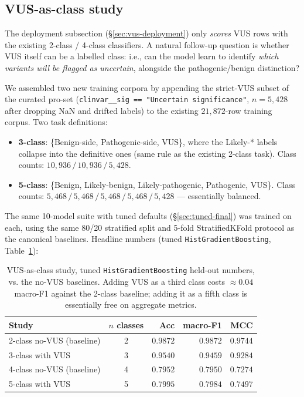 \documentclass[11pt,a4paper]{article}
\begin{document}
\subsection{VUS-as-class study}
\label{sec:vus-class}

The deployment subsection (\S\ref{sec:vus-deployment}) only \emph{scores}
VUS rows with the existing 2-class / 4-class classifiers. A natural
follow-up question is whether VUS itself can be a labelled class:
i.e., can the model learn to identify \emph{which variants will be
flagged as uncertain}, alongside the pathogenic/benign distinction?

We assembled two new training corpora by appending the strict-VUS subset
of the curated pro-set (\texttt{clinvar\_\_sig == "Uncertain significance"},
$n=5{,}428$ after dropping NaN and drifted labels) to the existing
$21{,}872$-row training corpus. Two task definitions:

\begin{itemize}[leftmargin=*]
    \item \textbf{3-class}: \{Benign-side, Pathogenic-side, VUS\}, where the
          Likely-* labels collapse into the definitive ones (same rule as the
          existing 2-class task). Class counts: $10{,}936\,/\,10{,}936\,/\,5{,}428$.
    \item \textbf{5-class}: \{Benign, Likely-benign, Likely-pathogenic,
          Pathogenic, VUS\}. Class counts: $5{,}468\,/\,5{,}468\,/\,5{,}468\,/\,5{,}468\,/\,5{,}428$ --- essentially balanced.
\end{itemize}

The same 10-model suite with tuned defaults (\S\ref{sec:tuned-final}) was
trained on each, using the same 80/20 stratified split and 5-fold
StratifiedKFold protocol as the canonical baselines. Headline numbers
(tuned \texttt{HistGradientBoosting}, Table~\ref{tab:vus-class}):

\begin{table}[H]
\centering
\caption{VUS-as-class study, tuned \texttt{HistGradientBoosting}
held-out numbers, vs. the no-VUS baselines. Adding VUS as a third class
costs $\approx 0.04$ macro-F1 against the 2-class baseline; adding it as
a fifth class is essentially free on aggregate metrics.}
\label{tab:vus-class}
\small
\begin{tabular}{lcrrr}
\toprule
Study & $n$ classes & Acc & macro-F1 & MCC \\
\midrule
2-class no-VUS (baseline) & 2 & $0.9872$ & $0.9872$ & $0.9744$ \\
3-class with VUS          & 3 & $0.9540$ & $\mathbf{0.9459}$ & $0.9284$ \\
4-class no-VUS (baseline) & 4 & $0.7952$ & $0.7950$ & $0.7274$ \\
5-class with VUS          & 5 & $0.7995$ & $\mathbf{0.7984}$ & $0.7497$ \\
\bottomrule
\end{tabular}
\end{table}
\end{document}
